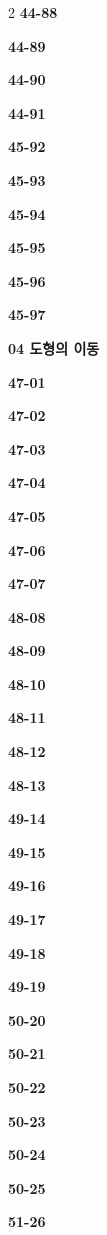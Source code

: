 \documentclass[10pt,a4paper]{article}
\begin{document}
\begin{multicols}{2}
\noindent\textbf{44-88}\ \par
\noindent\textbf{44-89}\ \par
\noindent\textbf{44-90}\ \par
\noindent\textbf{44-91}\ \par
\noindent\textbf{45-92}\ \par
\noindent\textbf{45-93}\ \par
\noindent\textbf{45-94}\ \par
\noindent\textbf{45-95}\ \par
\noindent\textbf{45-96}\ \par
\noindent\textbf{45-97}\ \par
\noindent\textbf{04 도형의 이동}\par\smallskip
\noindent\textbf{47-01}\ \par
\noindent\textbf{47-02}\ \par
\noindent\textbf{47-03}\ \par
\noindent\textbf{47-04}\ \par
\noindent\textbf{47-05}\ \par
\noindent\textbf{47-06}\ \par
\noindent\textbf{47-07}\ \par
\noindent\textbf{48-08}\ \par
\noindent\textbf{48-09}\ \par
\noindent\textbf{48-10}\ \par
\noindent\textbf{48-11}\ \par
\noindent\textbf{48-12}\ \par
\noindent\textbf{48-13}\ \par
\noindent\textbf{49-14}\ \par
\noindent\textbf{49-15}\ \par
\noindent\textbf{49-16}\ \par
\noindent\textbf{49-17}\ \par
\noindent\textbf{49-18}\ \par
\noindent\textbf{49-19}\ \par
\noindent\textbf{50-20}\ \par
\noindent\textbf{50-21}\ \par
\noindent\textbf{50-22}\ \par
\noindent\textbf{50-23}\ \par
\noindent\textbf{50-24}\ \par
\noindent\textbf{50-25}\ \par
\noindent\textbf{51-26}\ \par

\end{multicols}
\end{document}
